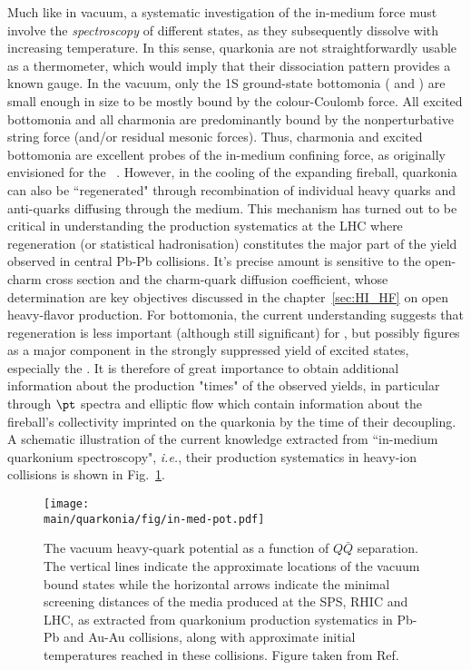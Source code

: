 \documentclass[../report.tex]{subfiles}
\providecommand{\main}{..}
\begin{document}
Much like in vacuum, a systematic investigation of the in-medium force must involve the 
{\em spectroscopy} of different states, as they subsequently dissolve with increasing 
temperature. In this sense, quarkonia are not straightforwardly usable as a thermometer, 
which would imply that their dissociation pattern provides a known gauge. In the vacuum, 
only the 1S ground-state bottomonia ( and \PGhb) are small enough in size 
to be mostly bound by the colour-Coulomb force. All excited bottomonia and all charmonia are 
predominantly bound by the nonperturbative string force (and/or residual mesonic forces). 
Thus, charmonia and excited bottomonia are excellent probes of the in-medium confining
force, as originally envisioned for the \PJgy~\cite{Matsui:1986dk}.
However, in the cooling of the expanding fireball, quarkonia can also be ``regenerated" 
through recombination of individual heavy quarks and anti-quarks diffusing through the medium. 
This mechanism has turned out to be critical in understanding the
\PJgy production systematics at the LHC where regeneration (or statistical hadronisation) 
constitutes the major part of the yield observed in central Pb-Pb collisions. It's precise
amount is sensitive to the open-charm cross section and the charm-quark diffusion
coefficient, whose determination are key objectives discussed in the chapter~\ref{sec:HI_HF} on open 
heavy-flavor production. For bottomonia, the current understanding suggests that regeneration 
is less 
important (although still significant) for , but possibly figures as a
major component in the strongly suppressed yield of excited states, especially the 
. It is therefore of great importance to obtain additional information about
the production "times" of the observed yields, in particular through $\pt$ spectra
and elliptic flow which contain information about the fireball's collectivity imprinted
on the quarkonia by the time of their decoupling. A schematic illustration of the current knowledge
extracted from ``in-medium quarkonium spectroscopy", {\it i.e.}, their production systematics 
in heavy-ion collisions is shown in Fig.~\ref{fig_pot}.        
\begin{figure}[!h]
\begin{center}
\texttt{[image: \\main/quarkonia/fig/in-med-pot.pdf]}
\end{center}
\vspace{-0.5cm}
\caption{The vacuum heavy-quark potential as a function of $Q\bar Q$ separation. The vertical
lines indicate the approximate locations of the vacuum bound states while the horizontal arrows
indicate the minimal screening distances of the media produced at the SPS, RHIC and LHC, as 
extracted from quarkonium production systematics in Pb-Pb and Au-Au collisions, along with 
approximate initial temperatures reached in these collisions. 
Figure taken from Ref.~\cite{Rapp:2017chc}}
\label{fig_pot}
\end{figure}
\end{document}
